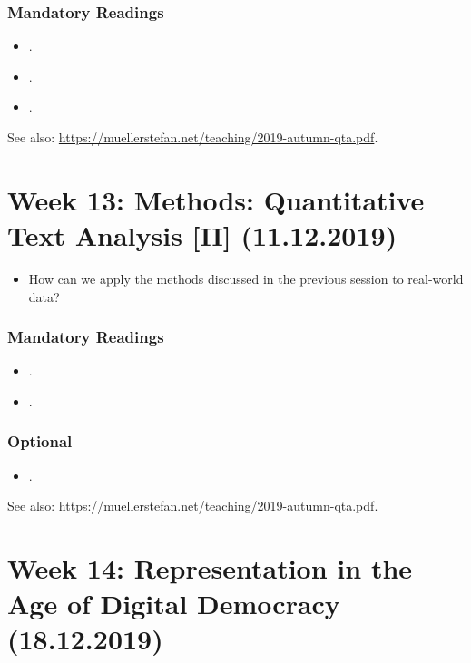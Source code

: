 \documentclass[abstract=on,parskip=full,headings=standardclasses,fontsize=11pt,paper=a4]{scrartcl}
\begin{document}
\subsubsection*{Mandatory Readings}
\begin{itemize}
\item {}.
\item {}.
\item {}.
\end{itemize}


See also: \url{https://muellerstefan.net/teaching/2019-autumn-qta.pdf}.

\section{Week 13:  Methods: Quantitative Text Analysis [II] (11.12.2019)}



\begin{itemize}
\renewcommand\labelitemi{--}
\item How can we apply the methods discussed in the previous session to real-world data?
\end{itemize}

\subsubsection*{Mandatory Readings}
\begin{itemize}
\item {}.
\item {}.
\end{itemize}


\subsubsection*{Optional}
\begin{itemize}
\item {}.
\end{itemize}

See also: \url{https://muellerstefan.net/teaching/2019-autumn-qta.pdf}.



\section{Week 14: Representation in the Age of Digital Democracy (18.12.2019)}
\end{document}
